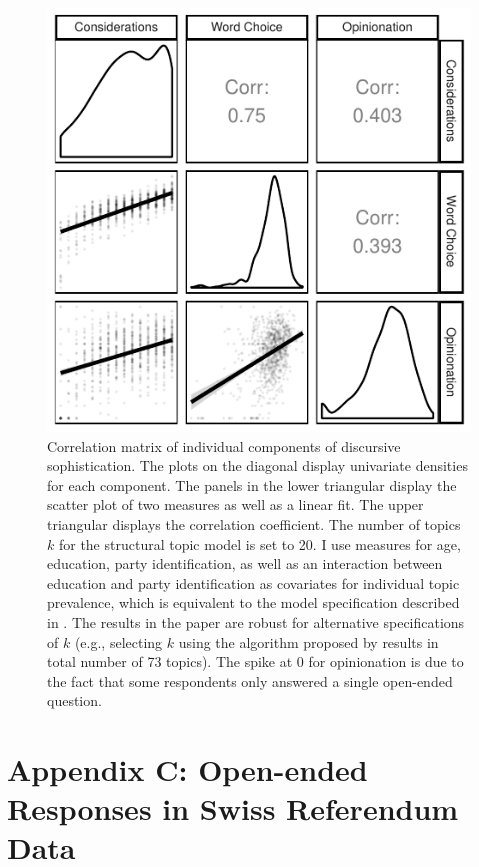 \documentclass[12pt]{article}
\begin{document}
\begin{figure}[h]\centering
\includegraphics{../fig/yg_corplot_components.pdf}
\caption{Correlation matrix of individual components of discursive sophistication. The plots on the diagonal display univariate densities for each component. The panels in the lower triangular display the scatter plot of two measures as well as a linear fit. The upper triangular displays the correlation coefficient. The number of topics $k$ for the structural topic model is set to 20. I use measures for age, education, party identification, as well as an interaction between education and party identification as covariates for individual topic prevalence, which is equivalent to the model specification described in \citet{roberts2014structural}. The results in the paper are robust for alternative specifications of $k$ (e.g., selecting $k$ using the algorithm proposed by \citet{lee2014low} results in total number of 73 topics). The spike at 0 for opinionation is due to the fact that some respondents only answered a single open-ended question.}\label{fig:yg_components}
\end{figure}



\clearpage
\section*{Appendix C: Open-ended Responses in Swiss Referendum Data}
\renewcommand\thefigure{B.\arabic{figure}}
\renewcommand\thetable{B.\arabic{table}}
\setcounter{figure}{0}
\setcounter{table}{0}
\end{document}

